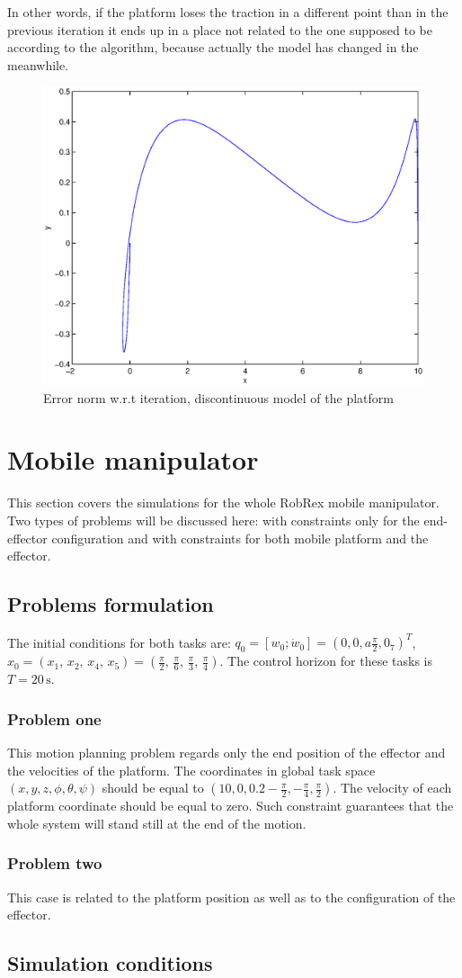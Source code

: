 In other words, if the platform loses the traction in a different point than in
the previous iteration it ends up in a place not related to the one supposed to be
according to the algorithm, because actually the model has changed in the meanwhile.
\begin{figure}[htp]
\centering
\includegraphics[height=0.3\textheight]{img/final_15_1_10_path.eps} %
\caption{Error norm w.r.t iteration, discontinuous model of the platform}
\label{fig:error_discont}
\end{figure}

\section{Mobile manipulator}
This section covers the simulations for the whole RobRex mobile manipulator. Two types of problems will
be discussed here: with constraints only for the end-effector configuration and with constraints for
both mobile platform and the effector.
\subsection{Problems formulation}
The initial conditions for both tasks are: $q_0 = [w_0; \dot{w}_0] = (0, 0, a\frac{\pi}{2}, 0_7)^T$, 
$x_0 = \left(
x_1 ,\, x_2 ,\, x_4 ,\, x_5
\right) = \left(
\frac{\pi}{2} ,\, \frac{\pi}{6} ,\, \frac{\pi}{3} ,\, \frac{\pi}{4}
\right).$ The control horizon for these tasks is $T=20\,\mathrm{s}$.
\subsubsection{Problem one}
This motion planning problem regards only the end position of the effector
and the velocities of the platform. 
The coordinates in global task space $(x, y, z, \phi, \theta, \psi) $ should be equal to
$(10, 0, 0.2-\frac{\pi}{2}, -\frac{\pi}{4}, \frac{\pi}{2})$. The velocity of each platform coordinate
should be equal to zero. Such constraint guarantees that the whole system will stand still at the end
of the motion.
\subsubsection{Problem two}
This case is related to the platform position as well as to the configuration of the effector.

\subsection{Simulation conditions}